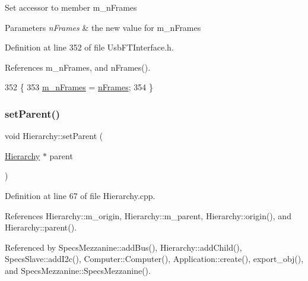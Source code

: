 Set accessor to member m\+\_\+n\+Frames 
\begin{DoxyParams}{Parameters}
{\em n\+Frames} & the new value for m\+\_\+n\+Frames \\
\hline
\end{DoxyParams}


Definition at line 352 of file Usb\+F\+T\+Interface.\+h.



References m\+\_\+n\+Frames, and n\+Frames().


\begin{DoxyCode}
352                                      \{
353     \hyperlink{classUsbFTInterface_a40770504afc4173034c8a8d6c5f5962c}{m\_nFrames} = \hyperlink{classUsbFTInterface_a694f5cb1d38d4369a597ad6761762c0e}{nFrames};
354   \}
\end{DoxyCode}
\mbox{\label{classHierarchy_a585ad1aeec16077a0e532ab8b4fc557b}} 
\subsubsection{\texorpdfstring{set\+Parent()}{setParent()}}
{\footnotesize\ttfamily void Hierarchy\+::set\+Parent (\begin{DoxyParamCaption}\item[{\hyperlink{classHierarchy}{Hierarchy} $\ast$}]{parent }\end{DoxyParamCaption})\hspace{0.3cm}{\ttfamily [inherited]}}



Definition at line 67 of file Hierarchy.\+cpp.



References Hierarchy\+::m\+\_\+origin, Hierarchy\+::m\+\_\+parent, Hierarchy\+::origin(), and Hierarchy\+::parent().



Referenced by Specs\+Mezzanine\+::add\+Bus(), Hierarchy\+::add\+Child(), Specs\+Slave\+::add\+I2c(), Computer\+::\+Computer(), Application\+::create(), export\+\_\+obj(), and Specs\+Mezzanine\+::\+Specs\+Mezzanine().


